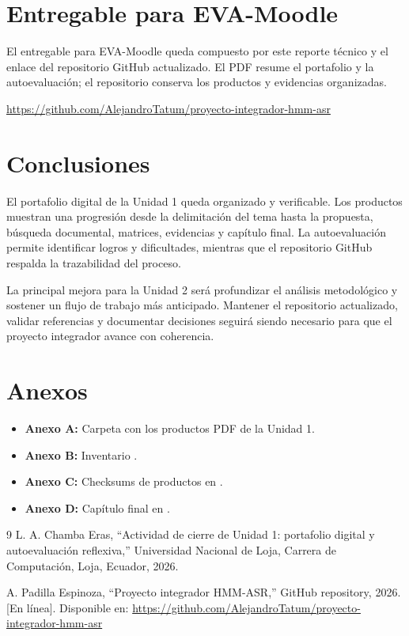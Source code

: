 \documentclass[11pt,a4paper]{article}
\begin{document}
\section{Entregable para EVA-Moodle}

El entregable para EVA-Moodle queda compuesto por este reporte técnico y el enlace del repositorio GitHub actualizado. El PDF resume el portafolio y la autoevaluación; el repositorio conserva los productos y evidencias organizadas.

\begin{center}
\url{https://github.com/AlejandroTatum/proyecto-integrador-hmm-asr}
\end{center}

\section{Conclusiones}

El portafolio digital de la Unidad 1 queda organizado y verificable. Los productos muestran una progresión desde la delimitación del tema hasta la propuesta, búsqueda documental, matrices, evidencias y capítulo final. La autoevaluación permite identificar logros y dificultades, mientras que el repositorio GitHub respalda la trazabilidad del proceso.

La principal mejora para la Unidad 2 será profundizar el análisis metodológico y sostener un flujo de trabajo más anticipado. Mantener el repositorio actualizado, validar referencias y documentar decisiones seguirá siendo necesario para que el proyecto integrador avance con coherencia.

\section{Anexos}

\begin{itemize}[leftmargin=1.1cm,itemsep=2pt]
  \item \textbf{Anexo A:} Carpeta  con los productos PDF de la Unidad 1.
  \item \textbf{Anexo B:} Inventario .
  \item \textbf{Anexo C:} Checksums de productos en .
  \item \textbf{Anexo D:} Capítulo final en .
\end{itemize}

\begin{thebibliography}{9}
L. A. Chamba Eras, ``Actividad de cierre de Unidad 1: portafolio digital y autoevaluación reflexiva,'' Universidad Nacional de Loja, Carrera de Computación, Loja, Ecuador, 2026.

A. Padilla Espinoza, ``Proyecto integrador HMM-ASR,'' GitHub repository, 2026. [En línea]. Disponible en: \url{https://github.com/AlejandroTatum/proyecto-integrador-hmm-asr}
\end{thebibliography}
\end{document}
